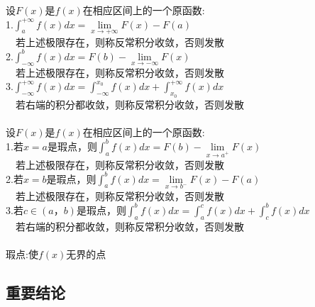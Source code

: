 \documentclass{article}
\begin{document}
\begin{flushleft}
	设$F(x)$是$f(x)$在相应区间上的一个原函数:\\
	1.$\int_{a}^{+\infty}f(x)dx=\lim\limits_{x\to+\infty}F(x)-F(a)$\\
	\ \ 若上述极限存在，则称反常积分收敛，否则发散\\
	2.$\int_{-\infty}^{b}f(x)dx=F(b)-\lim\limits_{x\to-\infty}F(x)$\\
	\ \ 若上述极限存在，则称反常积分收敛，否则发散\\
	3.$\int_{-\infty}^{+\infty}f(x)dx=\int_{-\infty}^{x_0}f(x)dx+\int_{x_0}^{+\infty}f(x)dx$\\
	\ \ 若右端的积分都收敛，则称反常积分收敛，否则发散\\
	~\\
	设$F(x)$是$f(x)$在相应区间上的一个原函数:\\
	1.若$x=a$是瑕点，则$\int_{a}^{b}f(x)dx=F(b)-\lim\limits_{x\to a^+}F(x)$\\
	\ \ 若上述极限存在，则称反常积分收敛，否则发散\\
	2.若$x=b$是瑕点，则$\int_{a}^{b}f(x)dx=\lim\limits_{x\to b^-}F(x)-F(a)$\\
	\ \ 若上述极限存在，则称反常积分收敛，否则发散\\
	3.若$c\in(a，b)$是瑕点，则$\int_{a}^{b}f(x)dx=\int_{a}^{c}f(x)dx+\int_{c}^{b}f(x)dx$\\
	\ \ 若右端的积分都收敛，则称反常积分收敛，否则发散\\
	~\\
	瑕点:使$f(x)$无界的点\\
	
	\subsection{重要结论}
	

\end{flushleft}
\end{document}

